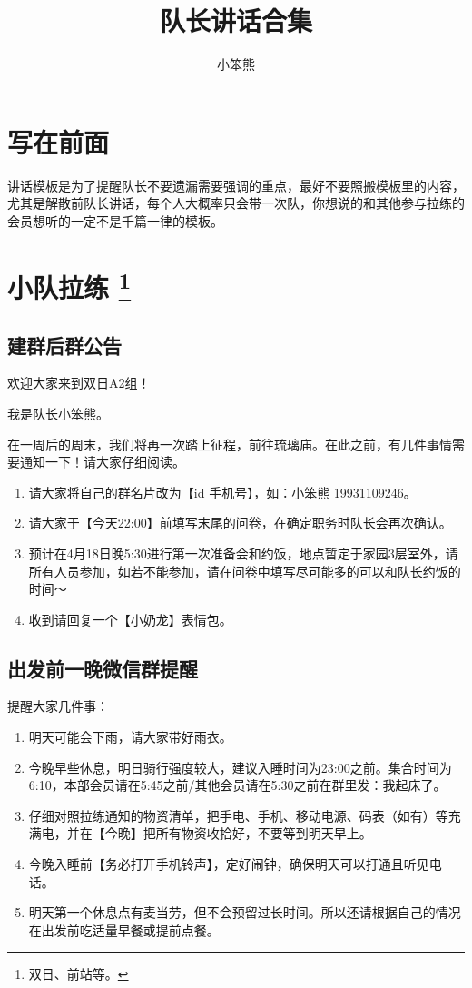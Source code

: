 \documentclass[UTF8]{ctexart}
\title{队长讲话合集}
\author{小笨熊}
\begin{document}
\maketitle

\tableofcontents

\section{写在前面}

讲话模板是为了提醒队长不要遗漏需要强调的重点，最好不要照搬模板里的内容，尤其是解散前队长讲话，每个人大概率只会带一次队，你想说的和其他参与拉练的会员想听的一定不是千篇一律的模板。

\section[小队拉练]{小队拉练 \protect\footnote{双日、前站等。} }

\subsection{建群后群公告}

欢迎大家来到双日A2组！

我是队长小笨熊。

在一周后的周末，我们将再一次踏上征程，前往琉璃庙。在此之前，有几件事情需要通知一下！请大家仔细阅读。

\begin{enumerate}[nosep,left=4em]
    \item 请大家将自己的群名片改为【id 手机号】，如：小笨熊 19931109246。
    \item 请大家于【今天22:00】前填写末尾的问卷，在确定职务时队长会再次确认。    
    \item 预计在4月18日晚5:30进行第一次准备会和约饭，地点暂定于家园3层室外，请所有人员参加，如若不能参加，请在问卷中填写尽可能多的可以和队长约饭的时间～    
    \item 收到请回复一个【小奶龙】表情包。
\end{enumerate}


\subsection{出发前一晚微信群提醒}\label{小队}

提醒大家几件事：
\begin{enumerate}[nosep,left=4em]
    \item 明天可能会下雨，请大家带好雨衣。
    \item 今晚早些休息，明日骑行强度较大，建议入睡时间为23:00之前。集合时间为6:10，本部会员请在5:45之前/其他会员请在5:30之前在群里发：我起床了。
    \item 仔细对照拉练通知的物资清单，把手电、手机、移动电源、码表（如有）等充满电，并在【今晚】把所有物资收拾好，不要等到明天早上。
    \item 今晚入睡前【务必打开手机铃声】，定好闹钟，确保明天可以打通且听见电话。
    \item 明天第一个休息点有麦当劳，但不会预留过长时间。所以还请根据自己的情况在出发前吃适量早餐或提前点餐。
\end{enumerate}
\end{document}

